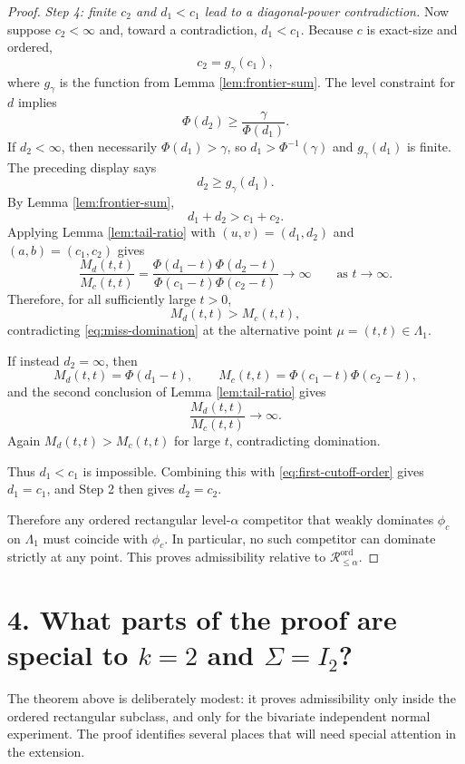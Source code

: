 \documentclass[12pt]{article}
\theoremstyle{definition}
\theoremstyle{remark}
\begin{document}
\begin{proof}
\emph{Step 4: finite $c_2$ and $d_1<c_1$ lead to a diagonal-power contradiction.}
Now suppose $c_2<\infty$ and, toward a contradiction, $d_1<c_1$.
Because $c$ is exact-size and ordered,
\[
c_2=g_\gamma(c_1),
\]
where $g_\gamma$ is the function from Lemma \ref{lem:frontier-sum}. The level constraint for $d$ implies
\[
\Phi(d_2)
\ge
\frac{\gamma}{\Phi(d_1)}.
\]
If $d_2<\infty$, then necessarily $\Phi(d_1)>\gamma$, so $d_1>\Phi^{-1}(\gamma)$ and $g_\gamma(d_1)$ is finite. The preceding display says
\[
d_2\ge g_\gamma(d_1).
\]
By Lemma \ref{lem:frontier-sum},
\begin{equation}\label{eq:d-sum-larger}
d_1+d_2>c_1+c_2.
\end{equation}
Applying Lemma \ref{lem:tail-ratio} with $(u,v)=(d_1,d_2)$ and $(a,b)=(c_1,c_2)$ gives
\[
\frac{M_d(t,t)}{M_c(t,t)}
=
\frac{\Phi(d_1-t)\Phi(d_2-t)}{\Phi(c_1-t)\Phi(c_2-t)}
\longrightarrow\infty
\qquad\text{as }t\to\infty.
\]
Therefore, for all sufficiently large $t>0$,
\[
M_d(t,t)>M_c(t,t),
\]
contradicting \eqref{eq:miss-domination} at the alternative point $\mu=(t,t)\in\Lambda_1$.

If instead $d_2=\infty$, then
\[
M_d(t,t)=\Phi(d_1-t),
\qquad
M_c(t,t)=\Phi(c_1-t)\Phi(c_2-t),
\]
and the second conclusion of Lemma \ref{lem:tail-ratio} gives
\[
\frac{M_d(t,t)}{M_c(t,t)}\to\infty.
\]
Again $M_d(t,t)>M_c(t,t)$ for large $t$, contradicting domination.

Thus $d_1<c_1$ is impossible. Combining this with \eqref{eq:first-cutoff-order} gives $d_1=c_1$, and Step 2 then gives $d_2=c_2$.

Therefore any ordered rectangular level-$\alpha$ competitor that weakly dominates $\phi_c$ on $\Lambda_1$ must coincide with $\phi_c$. In particular, no such competitor can dominate strictly at any point. This proves admissibility relative to $\mathcal R^{\mathrm{ord}}_{\le\alpha}$.
\end{proof}

\section*{4. What parts of the proof are special to $k=2$ and $\Sigma=I_2$?}

The theorem above is deliberately modest: it proves admissibility only inside the ordered rectangular subclass, and only for the bivariate independent normal experiment. The proof identifies several places that will need special attention in the extension.
\end{document}
